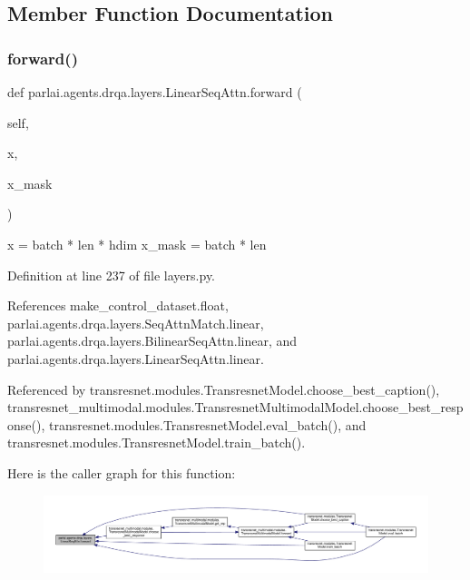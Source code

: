 \subsection{Member Function Documentation}
\mbox{\label{classparlai_1_1agents_1_1drqa_1_1layers_1_1LinearSeqAttn_adae548d437f9b26ca9d928989e80a3ad}} 
\subsubsection{\texorpdfstring{forward()}{forward()}}
{\footnotesize\ttfamily def parlai.\+agents.\+drqa.\+layers.\+Linear\+Seq\+Attn.\+forward (\begin{DoxyParamCaption}\item[{}]{self,  }\item[{}]{x,  }\item[{}]{x\+\_\+mask }\end{DoxyParamCaption})}

\begin{DoxyVerb}x = batch * len * hdim
x_mask = batch * len
\end{DoxyVerb}
 

Definition at line 237 of file layers.\+py.



References make\+\_\+control\+\_\+dataset.\+float, parlai.\+agents.\+drqa.\+layers.\+Seq\+Attn\+Match.\+linear, parlai.\+agents.\+drqa.\+layers.\+Bilinear\+Seq\+Attn.\+linear, and parlai.\+agents.\+drqa.\+layers.\+Linear\+Seq\+Attn.\+linear.



Referenced by transresnet.\+modules.\+Transresnet\+Model.\+choose\+\_\+best\+\_\+caption(), transresnet\+\_\+multimodal.\+modules.\+Transresnet\+Multimodal\+Model.\+choose\+\_\+best\+\_\+response(), transresnet.\+modules.\+Transresnet\+Model.\+eval\+\_\+batch(), and transresnet.\+modules.\+Transresnet\+Model.\+train\+\_\+batch().

Here is the caller graph for this function\+:
\nopagebreak
\begin{figure}[H]
\begin{center}
\leavevmode
\includegraphics[width=350pt]{classparlai_1_1agents_1_1drqa_1_1layers_1_1LinearSeqAttn_adae548d437f9b26ca9d928989e80a3ad_icgraph}
\end{center}
\end{figure}


